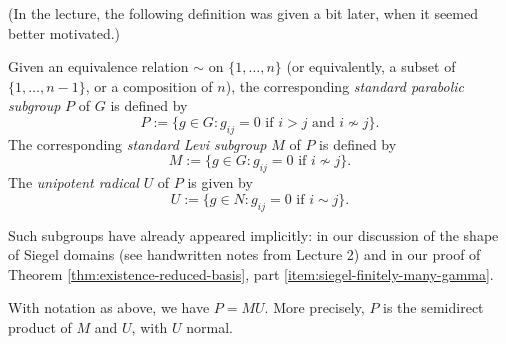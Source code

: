 \documentclass[reqno]{amsart} 
\begin{document}
(In the lecture, the following definition was given a bit later, when it seemed better motivated.)
\begin{definition}
  Given an equivalence relation $\sim$ on $\{1, \dotsc, n\}$ (or equivalently, a subset of $\{1, \dotsc, n-1\}$, or a composition of $n$), the corresponding \emph{standard parabolic subgroup} $P$ of $G$ is defined by
  \begin{equation*}
    P := \{g \in G : g_{i j} = 0 \text{ if } i > j \text{ and } i \not \sim j \}.
  \end{equation*}
  The corresponding \emph{standard Levi subgroup} $M$ of $P$ is defined by
  \begin{equation*}
    M := \{g \in G : g_{i j} = 0 \text{ if } i \not \sim j\}.
  \end{equation*}
  The \emph{unipotent radical} $U$ of $P$ is given by
  \begin{equation*}
    U := \{g \in N : g_{i j}  = 0 \text{ if } i \sim j\}.
  \end{equation*}
\end{definition}
Such subgroups have already appeared implicitly: in our discussion of the shape of Siegel domains (see handwritten notes from Lecture 2) and in our proof of Theorem \ref{thm:existence-reduced-basis}, part \eqref{item:siegel-finitely-many-gamma}.

\begin{exercise}
  With notation as above, we have $P = M U$.  More precisely, $P$ is the semidirect product of $M$ and $U$, with $U$ normal.
\end{exercise}
\end{document}
